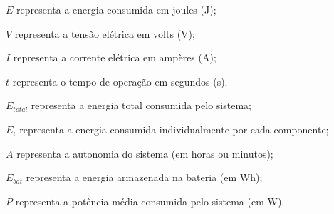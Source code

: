 \begin{simbolos}
  \item $E$ representa a energia consumida em joules (J);
  \item $V$ representa a tensão elétrica em volts (V);
  \item $I$ representa a corrente elétrica em ampères (A);
  \item $t$ representa o tempo de operação em segundos (s).
  \item $E_{total}$ representa a energia total consumida pelo sistema;
  \item $E_i$ representa a energia consumida individualmente por cada componente;
  \item $A$ representa a autonomia do sistema (em horas ou minutos);
  \item $E_{bat}$ representa a energia armazenada na bateria (em Wh);
  \item $P$ representa a potência média consumida pelo sistema (em W).
\end{simbolos}


